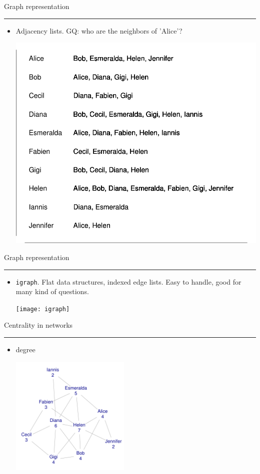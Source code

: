 \documentclass[landscape,fleqno]{foils}
\newcommand{\stitle}[1]{{\color{blue}\Large #1\par\vspace*{10pt}\hrule}}
\newcommand{\igraph}{\texttt{{igraph}}\xspace}
\newenvironment{narrow}[2]{%
  \begin{list}{}{%
      \setlength{\topsep}{0pt}%
      \setlength{\leftmargin}{#1}%
      \setlength{\rightmargin}{#2}%
      \setlength{\listparindent}{\parindent}%
      \setlength{\itemindent}{\parindent}%
      \setlength{\parsep}{\parskip}}%
    \item[]}{\end{list}}
\begin{document}
\newpage
\stitle{Graph representation}
\begin{narrow}{0cm}{15cm}
\begin{itemize}
\item Adjacency lists. GQ: who are the neighbors of 'Alice'?
\begin{center}
  \includegraphics{adjlist}
\end{center}
\end{itemize}
\end{narrow}

\newpage
\stitle{Graph representation}
\begin{narrow}{0cm}{15cm}
\begin{itemize}
\item \igraph. Flat data structures, indexed edge lists. Easy to
  handle, good for many kind of questions.
\begin{center}
  \texttt{[image: igraph]}
\end{center}
\end{itemize}
\end{narrow}

\newpage
\stitle{Centrality in networks}
\begin{narrow}{0cm}{15cm}
\begin{itemize}
\item degree
\begin{center}
\includegraphics[width=0.45\textwidth]{ex-deg}
\end{center}
\end{itemize}
\end{narrow}
\end{document}
